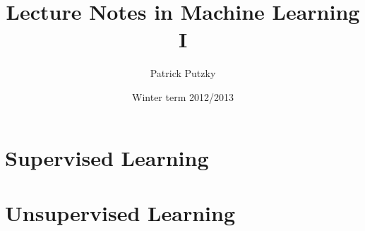 \documentclass[12pt,a4paper]{article}
\title{Lecture Notes in Machine Learning I}
\author{Patrick Putzky}
\date{Winter term 2012/2013}
\theoremstyle{break}
\begin{document}
    
    \tableofcontents
    \newpage
    
    
    
    \part{Supervised Learning}
    
    
    
    
    
		

\pagebreak
	
    \part{Unsupervised Learning}    
   	
   	
   	
   	
  	
  	  	

    \newpage
    
    
\end{document}
